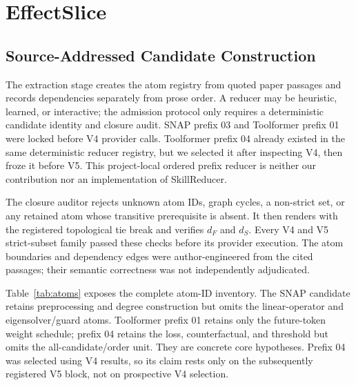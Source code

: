 \documentclass[letterpaper]{article} %
\begin{document}
\section{EffectSlice}

\subsection{Source-Addressed Candidate Construction}

The extraction stage creates the atom registry from quoted paper passages and
records dependencies separately from prose order.  A reducer may be heuristic,
learned, or interactive; the admission protocol only requires a deterministic
candidate identity and closure audit.  SNAP prefix 03 and Toolformer prefix 01
were locked before V4 provider calls.  Toolformer prefix 04 already existed in
the same deterministic reducer registry, but we selected it after inspecting V4,
then froze it before V5.  This project-local ordered prefix reducer is neither
our contribution nor an implementation of SkillReducer.

The closure auditor rejects unknown atom IDs, graph cycles, a non-strict set, or
any retained atom whose transitive prerequisite is absent.  It then renders with
the registered topological tie break and verifies $d_F$ and $d_S$.  Every V4 and
V5 strict-subset family passed these checks before its provider execution.  The atom
boundaries and dependency edges were author-engineered from the cited passages;
their semantic correctness was not independently adjudicated.

Table~\ref{tab:atoms} exposes the complete atom-ID inventory.  The SNAP candidate
retains preprocessing and degree construction but omits the linear-operator and
eigensolver/guard atoms.  Toolformer prefix 01 retains only the future-token
weight schedule; prefix 04 retains the loss, counterfactual, and threshold but
omits the all-candidate/order unit.  They are concrete core hypotheses.  Prefix
04 was selected using V4 results, so its claim rests only on the subsequently
registered V5 block, not on prospective V4 selection.
\end{document}
